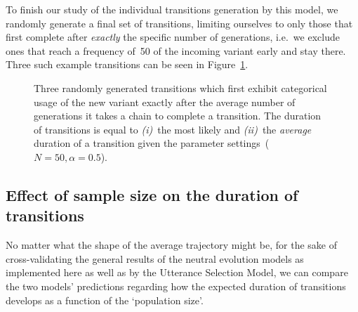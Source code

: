 
To finish our study of the individual transitions generation by this model, we randomly generate a final set of transitions, limiting ourselves to only those that first complete after \emph{exactly} the specific number of generations, i.e.~we exclude ones that reach a frequency of~50 of the incoming variant early and stay there. Three such example transitions can be seen in Figure~\ref{fig:complexconditioningtransitions}.

\begin{figure}[htbp]

{\centering {}

}

\caption[Three randomly generated transitions which first exhibit categorical usage of the new variant exactly after the average number of generations it takes a chain to complete a transition]{Three randomly generated transitions which first exhibit categorical usage of the new variant exactly after the average number of generations it takes a chain to complete a transition. The duration of transitions is equal to \emph{(i)}~the most likely and \emph{(ii)}~the \emph{average} duration of a transition given the parameter settings~($N=50, \alpha=0.5$).}\label{fig:complexconditioningtransitions}
\end{figure}



\subsection{Effect of sample size on the duration of transitions}

No matter what the shape of the average trajectory might be, for the sake of cross-validating the general results of the neutral evolution models as implemented here as well as by the Utterance Selection Model, we can compare the two models' predictions regarding how the expected duration of transitions develops as a function of the `population size'.

